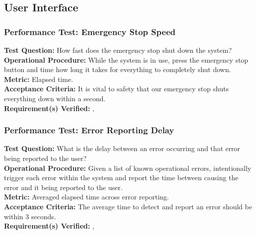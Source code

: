 
\subsection{User Interface}
\label{sec:verification_ui}

\subsubsection{Performance Test: Emergency Stop Speed}
\label{test:ui_pt_stop_speed}
\textbf{Test Question:} How fast does the emergency stop shut down the system? \\
\textbf{Operational Procedure:} While the system is in use, press the emergency stop button and time how long it takes for everything to completely shut down.\\
\textbf{Metric:} Elapsed time. \\
\textbf{Acceptance Criteria:} It is vital to safety that our emergency stop shuts everything down within a second. \\
\textbf{Requirement(s) Verified:} , 

\subsubsection{Performance Test: Error Reporting Delay}
\label{test:ui_pt_error_delay}
\textbf{Test Question:} What is the delay between an error occurring and that error being reported to the user? \\
\textbf{Operational Procedure:} Given a list of known operational errors, intentionally trigger each error within the system and report the time between causing the error and it being reported to the user. \\
\textbf{Metric:} Averaged elapsed time across error reporting. \\
\textbf{Acceptance Criteria:} The average time to detect and report an error should be within 3 seconds. \\
\textbf{Requirement(s) Verified:} , 

